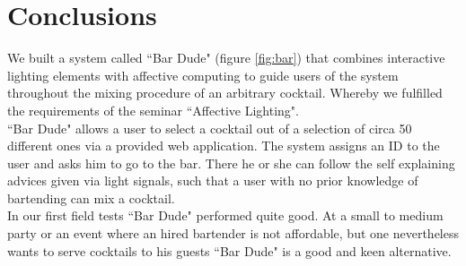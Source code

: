 \documentclass{acm_proc_article-sp}
\begin{document}
\section{Conclusions}
We built a system called ``Bar Dude" (figure \ref{fig:bar}) that combines interactive lighting elements with affective computing to guide users of the system throughout the mixing procedure of an arbitrary cocktail. Whereby we fulfilled the requirements of the seminar ``Affective Lighting". \\
``Bar Dude" allows a user to select a cocktail out of a selection of circa 50 different ones via a provided web application. The system assigns an ID to the user and asks him to go to the bar. There he or she can follow the self explaining advices given via light signals, such that a user with no prior knowledge of bartending can mix a cocktail. \\
In our first field tests ``Bar Dude" performed quite good. At a small to medium party or an event where an hired bartender is not affordable, but one nevertheless wants to serve cocktails to his guests ``Bar Dude" is a good and keen alternative.

\begin{minipage}{\linewidth}%
\label{fig:bar}%
\end{minipage}
\end{document}
